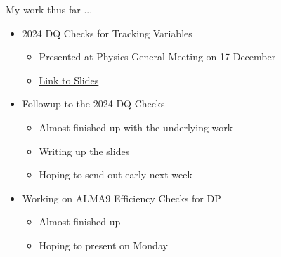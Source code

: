 
\begin{frame}{My work thus far ...}
    \begin{itemize}
        \item 2024 DQ Checks for Tracking Variables
        \begin{itemize}
            \item Presented at Physics General Meeting on 17 December 
            \item \href{https://indico.cern.ch/event/1488927/contributions/6275978/attachments/2988614/5264126/main.pdf}{Link to Slides}
        \end{itemize}
        \item Followup to the 2024 DQ Checks
        \begin{itemize}
            \item Almost finished up with the underlying work 
            \item Writing up the slides
            \item Hoping to send out early next week
        \end{itemize}
        \item Working on ALMA9 Efficiency Checks for DP
        \begin{itemize}
            \item Almost finished up 
            \item Hoping to present on Monday
        \end{itemize}
    \end{itemize}
\end{frame}


